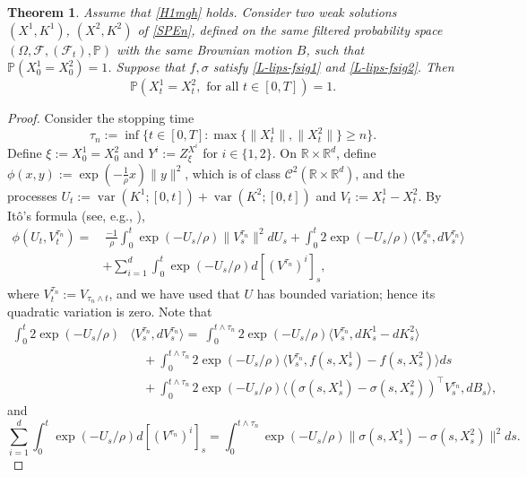 \documentclass[preprint,12pt]{elsarticle}
\newcommand{\R}{\mathbb{R}}
\theoremstyle{plain}
\newtheorem{theorem}{Theorem}[section]
\theoremstyle{definition}
\theoremstyle{remark}
\begin{document}
	\begin{theorem}\label{pathwise-uniqueness}
		 Assume that \ref{H1mgh} holds. Consider two weak solutions $(X^1,K^1)$, $(X^2,K^2)$ of \eqref{SPEn}, defined on the same filtered probability space $(\Omega,\mathcal{F},(\mathcal{F}_t),\mathbb{P})$ with the same Brownian motion $B$, such that $\mathbb{P}(X_0^1 = X_0^2) = 1$. Suppose that $f,\sigma$ satisfy \eqref{L-lips-fsig1} and \eqref{L-lips-fsig2}. Then 
        $$
        \mathbb{P}(X^1_t = X^2_t, \textrm{ for all } t\in [0,T]) = 1.
        $$    
	\end{theorem}
	\begin{proof}
Consider the stopping time 
$$
\tau_n := \inf\{ t\in [0,T] : \max\{\|X_t^1\|,\|X_t^2\|\}\geq n \}.
$$ 
Define $\xi := X_0^1 = X_0^2$ and $Y^i := Z^{X^i}_\xi$ for $i\in \{1,2\}$.  On $\R\times\R^d$, define $\phi(x,y):=\exp(-\frac{1}{\rho}x)\|y\|^2$, which is of class $\mathcal{C}^2(\R\times \R^d)$, and the processes $U_t := \operatorname{var}(K^1;[0,t]) + \operatorname{var}(K^2;[0,t])$ and $V_t := X_t^1-X_t^2$. By Itô's formula (see, e.g., \cite[Theorem 3.6, p. 153]{MR1121940}),
\begin{equation}\label{ito-uniqueness}
\begin{aligned}
\phi(U_t,V_t^{\tau_n}) = & \ \frac{-1}{\rho}\int_{0}^t \exp(-U_s/\rho)\|V_s^{\tau_n}\|^2 dU_s +\int_{0}^t 2\exp(-U_s/\rho)\langle V_s^{\tau_n},dV_s^{\tau_n}\rangle\\
&+\sum_{i=1}^d \int_{0}^t \exp(-U_s/\rho) d[(V^{\tau_n})^i]_s,
\end{aligned}
\end{equation}
where $V^{\tau_n}_t := V_{\tau_n\wedge t}$, and we have used that $U$ has bounded variation; hence its quadratic variation is zero. Note that 
		\begin{equation*}
\begin{aligned}
				\int_{0}^t 2\exp(-U_s/\rho)&\langle V_s^{\tau_n},dV_s^{\tau_n}\rangle 
				 =   \ \int_0^{t\wedge\tau_n} 2\exp(-U_s/\rho)\langle V_s^{\tau_n},dK_s^1-dK_s^2\rangle\\
				&\quad  + \int_0^{t\wedge\tau_n} 2\exp(-U_s/\rho) \langle V_s^{\tau_n}, f(s,X_s^1)-f(s,X_s^2)\rangle ds\\
				&\quad + \int_0^{t\wedge\tau_n}  2\exp(-U_s/\rho) \langle (\sigma(s,X_s^1)-\sigma(s,X_s^2))^\top V_s^{\tau_n},dB_s\rangle,
			\end{aligned}
		\end{equation*}
		and 
		\begin{equation*}
			\sum_{i=1}^d \int_{0}^t \exp(-U_s/\rho) d[(V^{\tau_n})^i]_s = \int_0^{t\wedge\tau_n} \exp(-U_s/\rho)\|\sigma(s,X_s^1) - \sigma(s,X_s^2)\|^2 ds.

\end{equation*}
\end{proof}
\end{document}
